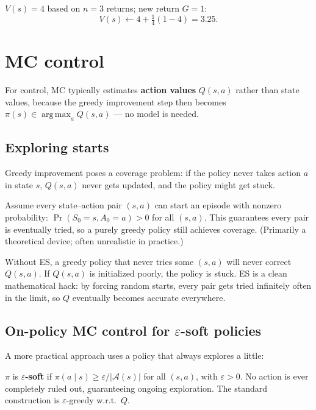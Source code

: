 \documentclass[11pt, oneside]{book}
\newcommand{\argmax}{\operatorname*{arg\,max}}
\newcommand{\Aset}{\mathcal{A}}          %
\begin{document}
\begin{exbox}[title={Incremental Update}]
$V(s) = 4$ based on $n=3$ returns; new return $G = 1$:
\[
  V(s) \leftarrow 4 + \tfrac{1}{4}(1-4) = 3.25.
\]
\end{exbox}

\section{MC control}

For control, MC typically estimates \textbf{action values} $Q(s,a)$ rather
than state values, because the greedy improvement step then becomes
$\pi(s) \in \argmax_a Q(s,a)$ --- no model is needed.

\subsection{Exploring starts}

Greedy improvement poses a coverage problem: if the policy never takes action
$a$ in state $s$, $Q(s,a)$ never gets updated, and the policy might get stuck.

\begin{defbox}[title={Exploring Starts (ES)}]
Assume every state--action pair $(s,a)$ can start an episode with nonzero
probability: $\Pr(S_0=s, A_0=a) > 0$ for all $(s,a)$.
This guarantees every pair is eventually tried, so a purely greedy policy
still achieves coverage.
(Primarily a theoretical device; often unrealistic in practice.)
\end{defbox}

\begin{intbox}[title={Why Exploring Starts Are Needed}]
Without ES, a greedy policy that never tries some $(s,a)$ will never correct
$Q(s,a)$. If $Q(s,a)$ is initialized poorly, the policy is stuck.
ES is a clean mathematical hack: by forcing random starts, every pair gets
tried infinitely often in the limit, so $Q$ eventually becomes accurate
everywhere.
\end{intbox}

\subsection{On-policy MC control for $\varepsilon$-soft policies}

A more practical approach uses a policy that always explores a little:

\begin{defbox}[title={$\varepsilon$-Soft Policy}]
$\pi$ is \textbf{$\varepsilon$-soft} if
$\pi(a\mid s) \ge \varepsilon / |\Aset(s)|$ for all $(s,a)$, with $\varepsilon > 0$.
No action is ever completely ruled out, guaranteeing ongoing exploration.
The standard construction is $\varepsilon$-greedy w.r.t.\ $Q$.
\end{defbox}
\end{document}
